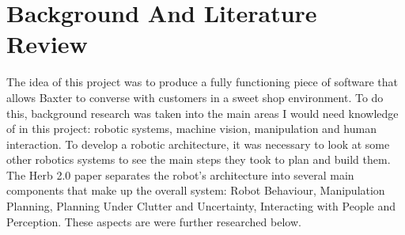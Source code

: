 \chapter{Background And Literature Review}
\label{chapter2}
The idea of this project was to produce a fully functioning piece of software that allows Baxter to converse with customers in a sweet shop environment. To do this, background research was taken into the main areas I would need knowledge of in this project: robotic systems, machine vision, manipulation and human interaction. To develop a robotic architecture, it was necessary to look at some other robotics systems to see the main steps they took to plan and build them. The Herb 2.0 paper \cite{herbrobot} separates the robot's architecture into several main components that make up the overall system: Robot Behaviour, Manipulation Planning, Planning Under Clutter and Uncertainty, Interacting with People and Perception. These aspects are were further researched below.
